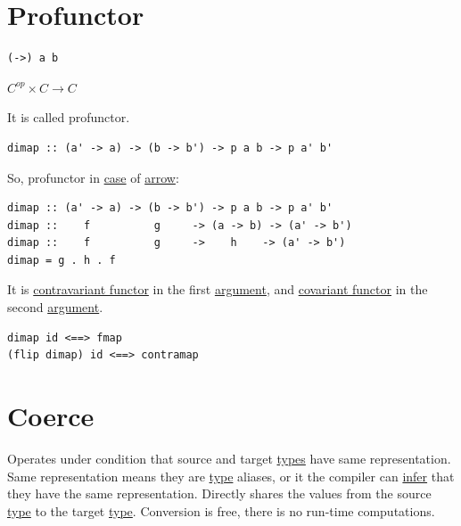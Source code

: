 \documentclass[a4paper,14pt,oneside]{book}
\begin{document}
\chapter{Profunctor}
\label{sec:org947d72a}

\begin{verbatim}
(->) a b
\end{verbatim}

\(C^{op} \times C \to C\)

It is called profunctor.

\begin{verbatim}
dimap :: (a' -> a) -> (b -> b') -> p a b -> p a' b'
\end{verbatim}

So, profunctor in \hyperref[org5d364f2]{case} of \hyperref[org4ba8fc5]{arrow}:


\begin{verbatim}
dimap :: (a' -> a) -> (b -> b') -> p a b -> p a' b'
dimap ::    f          g     -> (a -> b) -> (a' -> b') 
dimap ::    f          g     ->    h    -> (a' -> b')
dimap = g . h . f
\end{verbatim}

It is \hyperref[org30165b6]{contravariant functor} in the first \hyperref[orgf60bb90]{argument}, and \hyperref[orge20bed6]{covariant functor} in the second \hyperref[orgf60bb90]{argument}.

\begin{verbatim}
dimap id <==> fmap
(flip dimap) id <==> contramap
\end{verbatim}

\chapter{Coerce}
\label{sec:org668e4bd}

Operates under condition that source and target \hyperref[org3dcb7ed]{types} have same representation.
Same representation means they are \hyperref[orga8cd5bc]{type} aliases, or it the compiler can \hyperref[orga60d5be]{infer} that they have the same representation. 
Directly shares the values from the source \hyperref[orga8cd5bc]{type} to the target \hyperref[orga8cd5bc]{type}.
Conversion is free, there is no run-time computations.
\end{document}
